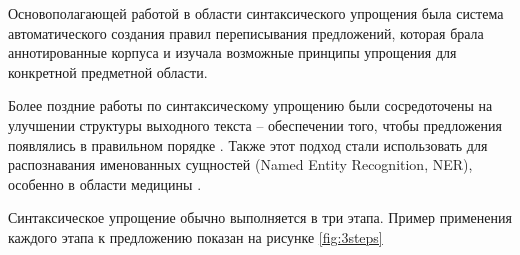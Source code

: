 
Основополагающей работой в области синтаксического упрощения была система автоматического создания правил переписывания предложений\cite{chandrasekar_automatic_1997}, которая брала аннотированные корпуса и изучала возможные принципы упрощения для конкретной предметной области.  

Более поздние работы по синтаксическому упрощению были сосредоточены на улучшении структуры выходного текста -- обеспечении того, чтобы предложения появлялись в правильном порядке \cite{siddharthan_syntactic_2006}. Также этот подход стали использовать для распознавания именованных сущностей (Named Entity Recognition, NER), особенно в области медицины \cite{jonnalagadda_biosimplify_2010}.

Синтаксическое упрощение обычно выполняется в три этапа. Пример применения каждого этапа к предложению показан на рисунке \ref{fig:3steps}

